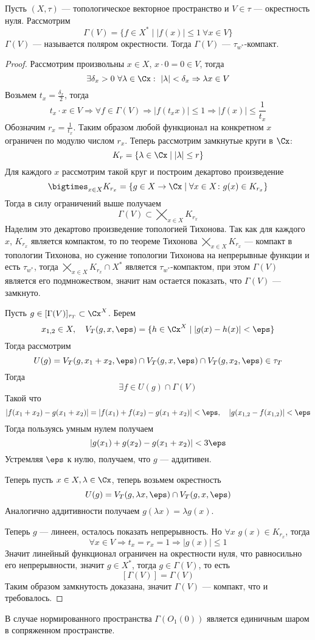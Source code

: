 \begin{theorem}\label{th:banach-alaoglu}
	Пусть $(X,\tau)$ --- топологическое векторное пространство и $ V\in \tau$ --- окрестность нуля. Рассмотрим
	$$
	\Gamma(V) = \{ f\in X^* \mid |f(x)| \leq 1  \ \forall x \in V\}
	$$
	$\Gamma(V)$ --- называется поляром окрестности. Тогда $\Gamma(V)$ --- $\tau_{w^*}$-компакт.
\end{theorem}
\begin{proof}
	Рассмотрим произвольны $x \in X$, $x\cdot 0 = 0 \in V$, тогда 
	$$
	\exists \delta_x > 0 \ \forall \lambda \in \Cx : \ |\lambda| < \delta_x \Rightarrow \lambda x \in V
	$$
	Возьмем $t_x = \frac{\delta_x}{2}$, тогда 
	$$
	t_x \cdot x \in V \Rightarrow \forall f \in \Gamma(V) \Rightarrow |f(t_x x)| \leq 1 \Rightarrow |f(x)| \leq \frac{1}{t_x}
	$$
	Обозначим $r_x = \frac{1}{t_x}$. Таким образом любой функционал на конкретном $x$ ограничен по модулю числом $r_x$. Теперь рассмотрим замкнутые круги в $\Cx$:
	$$
	K_r = \{\lambda \in \Cx \mid |\lambda| \leq r\}
	$$
	Для каждого $x$ рассмотрим такой круг и построим декартово произведение
	$$
	\bigtimes_{x\in X} K_{r_x} = \{g \in X \to \Cx \mid \forall x \in X\colon  g(x) \in K_{r_x}\}
	$$
	Тогда в силу ограничений выше получаем 
	$$
	\Gamma(V) \subset 	\bigtimes_{x\in X} K_{r_x} 
	$$
	Наделим это декартово произведение топологией Тихонова. Так как для каждого $x$, $K_{r_x}$ является компактом, то по теореме Тихонова $	\bigtimes_{x\in X} K_{r_x} $ --- компакт в топологии Тихонова, но сужение топологии Тихонова на непрерывные функции и есть $\tau_{w^*}$, тогда $	\bigtimes_{x\in X} K_{r_x}  \cap X^*$ является $\tau_{w^*}$-компактом, при этом $\Gamma(V)$ является его подмножеством, значит нам остается показать, что $\Gamma(V)$ --- замкнуто. 
	
	Пусть $ g \in [\Gamma(V)]_{\tau_T} \subset \Cx^X$. Берем 
	$$
	x_{1,2} \in X,  \quad V_T(g,x,\eps) = \{h \in \Cx^X \mid |g(x) - h(x)| < \eps\}
	$$
	Тогда рассмотрим 
	$$
	U(g) = V_T(g, x_1 + x_2, \eps) \cap V_T(g,x,\eps) \cap V_T(g,x_2,\eps) \in \tau_T
	$$
	Тогда 
	$$
	\exists f \in U(g) \cap \Gamma(V)
	$$
	Такой что 
	$$
	|f(x_1 + x_2) - g(x_1 + x_2)| = |f(x_1) + f(x_2) - g(x_1 + x_2)| < \eps, \quad|g(x_{1,2} - f(x_{1,2})| < \eps
	$$
	Тогда пользуясь умным нулем получаем
	$$
	|g(x_1) + g(x_2) - g(x_1 + x_2)| < 3\eps
	$$
	Устремляя $\eps$ к нулю, получаем, что $g$ --- аддитивен. 
	
	Теперь пусть $x \in X, \lambda \in \Cx$, теперь возьмем окрестность 
	$$
	U(g) = V_T(g,\lambda x, \eps) \cap V_T(g,x,\eps)
	$$
	Аналогично аддитивности получаем $g(\lambda x) = \lambda g(x)$. 
	
	Теперь $g$ --- линеен, осталось показать непрерывность. Но $\forall x$ $g(x) \in K_{r_x}$, тогда 
	$$
	\forall x \in V \Rightarrow t_x = r_x = 1 \Rightarrow |g(x)| \leq 1
	$$
	Значит линейный функционал ограничен на окрестности нуля, что равносильно его непрерывности, значит $g \in X^*$, тогда $g \in \Gamma(V)$, то есть 
	$$
	[\Gamma(V)] = \Gamma(V)
	$$
	Таким образом замкнутость доказана, значит $\Gamma(V)$ --- компакт, что и требовалось.
\end{proof} 
\begin{remark}
	В случае нормированного пространства $\Gamma(O_1(0))$ является единичным шаром в сопряженном пространстве. 
\end{remark}
